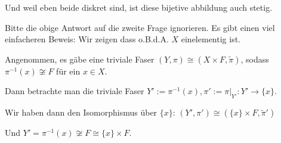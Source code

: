 Und weil eben beide diskret sind, ist diese bijetive abbildung auch stetig.



Bitte die obige Antwort auf die zweite Frage ignorieren. Es gibt einen viel einfacheren Beweis: Wir zeigen dass o.B.d.A. $X$ einelementig ist.

Angenommen, es gäbe eine triviale Faser $(Y,\pi) \cong (X \times F,\tilde{\pi})$, sodass $\pi^{-1}(x) \not\cong F$ für ein $x \in X$.

Dann betrachte man die triviale Faser $Y' := \pi^{-1}(x), \pi' := \pi|_{Y'}: Y' \to \{x\}$.

Wir haben dann den Isomorphismus über $\{x\}$: $(Y',\pi') \cong (\{x\}\times F,\tilde{\pi}')$

Und $Y' = \pi^{-1}(x) \not\cong F \cong \{x\} \times F$.



